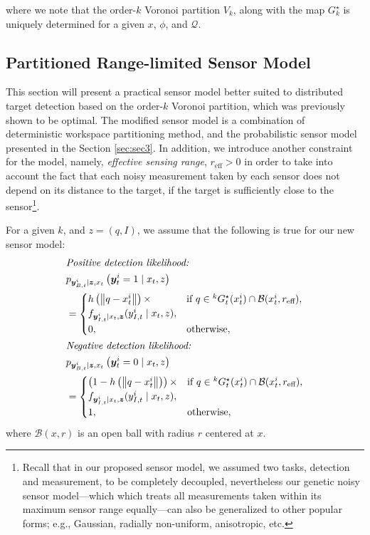 \documentclass[journal]{IEEEtran}
\begin{document}
\noindent where we note that the order-$k$ Voronoi partition $V_k$, along with the map $G_k^{\star}$ is uniquely determined for a given $x$, $\phi$, and $\mathcal{Q}$. 

\subsection{Partitioned Range-limited Sensor Model}
This section will present a practical sensor model better suited to distributed target detection based on the order-$k$ Voronoi partition, which was previously shown to be optimal.
The modified sensor model is a combination of deterministic workspace partitioning method, and the probabilistic sensor model presented in the Section \ref{sec:sec3}. In addition, we introduce another constraint for the model, namely, \emph{effective sensing range},  $r_{\text{eff}} >0$ in order to take into account the fact that each noisy measurement taken by each sensor does not depend on its distance to the target, if the target is sufficiently close to the sensor\footnote{Recall that in our proposed sensor model, we assumed two tasks, detection and measurement, to be completely decoupled, nevertheless our genetic noisy sensor model---which which treats all measurements taken within its maximum sensor range equally---can also be generalized to other popular forms; e.g., Gaussian, radially non-uniform, anisotropic, etc.}. 

For a given $k$, and $z = (q,I)$, we assume that the following is true for our new sensor model:
\begin{align}
&\textit{Positive detection likelihood:} \nonumber \\
&p_{\bm{y}_{B,t}^i \mid \bm{z},x_t
}\left(\bm{y}_t^i = 1 \mid x_t,z
\right) \nonumber\\
&=\begin{cases}
h\left(\left\|q-x_t^i \right\|\right) \times & \textup{if }q \in {}^kG_t^{\star}(x_t^i)
\cap \mathcal{B}(x_t^i,r_{\text{eff}})
,\nonumber \\
f_{\bm{y}_{I,t}^i \mid x_t,\bm{z}}(y_{I,t}^i \mid x_t,z),  \\
0, & \textup{otherwise},
\end{cases}\nonumber \\
&\textit{Negative detection likelihood:} \nonumber\\
&p_{\bm{y}_{B,t}^i \mid \bm{z},x_t
}\left(\bm{y}_t^i = 0 \mid x_t,z
\right)\nonumber  \\
&=\begin{cases}
\left(1-h\left(\left\|q-x_t^i \right\|\right)\right) \times & \textup{if }q \in {}^kG_t^{\star}(x_t^i) \cap \mathcal{B}(x_t^i,r_{\text{eff}}), \\
f_{\bm{y}_{I,t}^i \mid x_t,\bm{z}}(y_{I,t}^i \mid x_t,z), \\
1,  & \textup{otherwise},
\end{cases}
\label{sensorf}
\end{align}
where $\mathcal{B}(x,r)$ is an open ball with radius $r$ centered at $x$.
\end{document}
